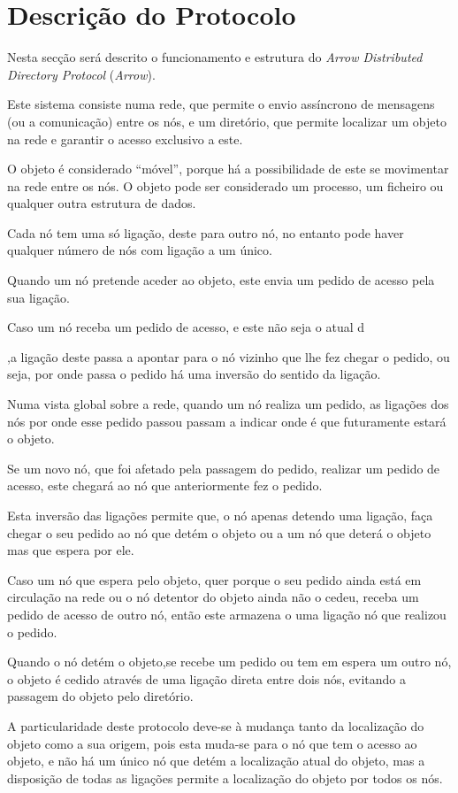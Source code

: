 \section{Descrição do Protocolo}

Nesta secção será descrito o funcionamento e estrutura do \textit{Arrow Distributed Directory Protocol} (\emph{Arrow}). 

Este sistema consiste numa rede, que permite o envio assíncrono de mensagens (ou a comunicação) entre os nós, e um diretório, que permite localizar um objeto na rede e garantir o acesso exclusivo a este. 

O objeto é considerado ``móvel'', porque há a possibilidade de este se movimentar na rede entre os nós.
O objeto pode ser considerado um processo, um ficheiro ou qualquer outra estrutura de dados.

Cada nó tem uma só ligação, deste para outro nó, no entanto pode haver qualquer número de nós com ligação a um único.

Quando um nó pretende aceder ao objeto, este envia um pedido de acesso pela sua ligação. 

Caso um nó receba um pedido de acesso, e este não seja o atual d

,a ligação deste passa a apontar para o nó vizinho que lhe fez chegar o pedido, ou seja, por onde passa o pedido há uma inversão do sentido da ligação.

Numa vista global sobre a rede, quando um nó realiza um pedido, as ligações dos nós por onde esse pedido passou passam a indicar onde é que futuramente estará o objeto.

Se um novo nó, que foi afetado pela passagem do pedido, realizar um pedido de acesso, este chegará ao nó que anteriormente fez o pedido.

Esta inversão das ligações permite que, o nó apenas detendo uma ligação, faça chegar o seu pedido ao nó que detém o objeto ou a um nó que deterá o objeto mas que espera por ele.

Caso um nó que espera pelo objeto, quer porque o seu pedido ainda está em circulação na rede ou o nó detentor do objeto ainda não o cedeu, receba um pedido de acesso de outro nó, então este armazena o uma ligação nó que realizou o pedido.

Quando o nó detém o objeto,se recebe um pedido ou tem em espera um outro nó, o objeto é cedido através de uma ligação direta entre dois nós, evitando a passagem do objeto pelo diretório.

A particularidade deste protocolo deve-se à mudança tanto da localização do objeto como a sua origem, pois esta muda-se para o nó que tem o acesso ao objeto, e não há um único nó que detém a localização atual do objeto, mas a disposição de todas as ligações permite a localização do objeto por todos os nós.

